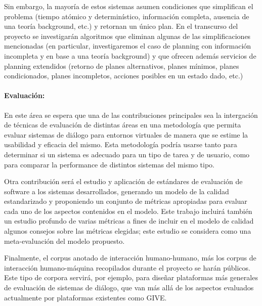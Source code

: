 Sin embargo, la mayor\'ia de estos sistemas asumen condiciones
que simplifican el problema (tiempo at\'omico y
determin\'istico, informaci\'on completa, ausencia de una teor\'ia
background, etc.) y retornan un \'unico plan.  En el transcurso
del proyecto se investigar\'an algoritmos que eliminan algunas
de las simplificaciones mencionadas (en particular, investigaremos
el caso de planning con informaci\'on incompleta y en base a una
teor\'ia background) y que ofrecen adem\'as servicios de planning
extendidos (retorno de planes alternativos, planes m\'inimos, planes
condicionados, planes incompletos, acciones posibles en un estado dado, etc.)

\paragraph{Evaluaci\'on:}
En este \'area se espera que una de las contribuciones principales sea la
intergaci\'on de t\'ecnicas de evaluaci\'on de distintas \'areas en una
metodolog\'ia que permita evaluar sistemas de di\'alogo para entornos virtuales
de manera que se estime la usabilidad y eficacia del mismo. Esta metodolog\'ia
podr\'ia usarse tanto para determinar si un sistema es adecuado para un tipo de
tarea y de usuario, como para comparar la performance de distintos sistemas del
mismo tipo.

Otra contribuci\'on ser\'a el estudio y aplicaci\'on de est\'andares de
evaluaci\'on de software a los sistemas desarrollados, generando un modelo de la
calidad estandarizado y proponiendo un conjunto de m\'etricas apropiadas para
evaluar cada uno de los aspectos contenidos en el modelo. Este trabajo
incluir\'a tambi\'en un estudio profundo de varias m\'etricas a fines de incluir
en el modelo de calidad algunos consejos sobre las m\'etricas elegidas; este
estudio se considera como una meta-evaluaci\'on del modelo propuesto.

Finalmente,
el corpus anotado de interacci\'on humano-humano, m\'as
los corpus de interacci\'on humano-m\'aquina recopilados
durante el proyecto se har\'an p\'ublicos.  Este tipo de
corpora servir\'a, por ejemplo, para dise\~nar plataformas
m\'as generales de evaluaci\'on de sistemas de di\'alogo,
que van m\'as all\'a de los aspectos evaluados actualmente
por plataformas existentes como GIVE.


